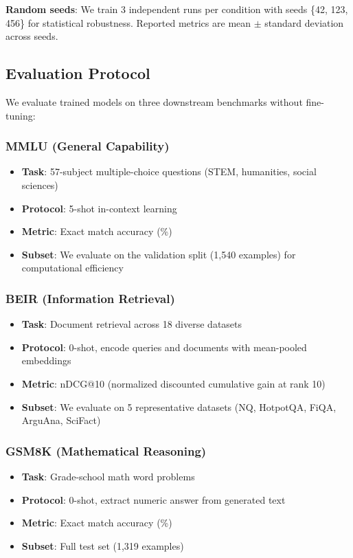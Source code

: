 \textbf{Random seeds}: We train 3 independent runs per condition with seeds \{42, 123, 456\} for statistical robustness. Reported metrics are mean $\pm$ standard deviation across seeds.

\subsection{Evaluation Protocol}

We evaluate trained models on three downstream benchmarks without fine-tuning:

\subsubsection{MMLU (General Capability)}

\begin{itemize}
\item \textbf{Task}: 57-subject multiple-choice questions (STEM, humanities, social sciences)
\item \textbf{Protocol}: 5-shot in-context learning
\item \textbf{Metric}: Exact match accuracy (\%)
\item \textbf{Subset}: We evaluate on the validation split (1,540 examples) for computational efficiency
\end{itemize}

\subsubsection{BEIR (Information Retrieval)}

\begin{itemize}
\item \textbf{Task}: Document retrieval across 18 diverse datasets
\item \textbf{Protocol}: 0-shot, encode queries and documents with mean-pooled embeddings
\item \textbf{Metric}: nDCG@10 (normalized discounted cumulative gain at rank 10)
\item \textbf{Subset}: We evaluate on 5 representative datasets (NQ, HotpotQA, FiQA, ArguAna, SciFact)
\end{itemize}

\subsubsection{GSM8K (Mathematical Reasoning)}

\begin{itemize}
\item \textbf{Task}: Grade-school math word problems
\item \textbf{Protocol}: 0-shot, extract numeric answer from generated text
\item \textbf{Metric}: Exact match accuracy (\%)
\item \textbf{Subset}: Full test set (1,319 examples)
\end{itemize}

